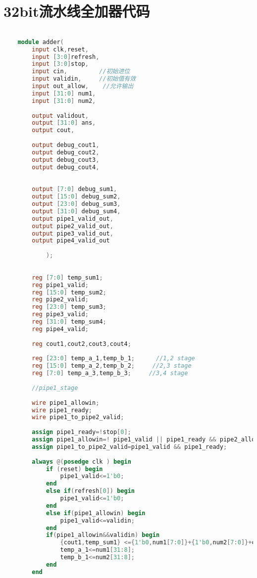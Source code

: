 \section{32bit流水线全加器代码}
\begin{lstlisting}[language=Verilog]

    module adder(
        input clk,reset,
        input [3:0]refresh,
        input [3:0]stop,
        input cin,         //初始进位
        input validin,     //初始值有效
        input out_allow,    //允许输出
        input [31:0] num1,
        input [31:0] num2,
        
        output validout,
        output [31:0] ans,
        output cout,
        
        output debug_cout1,
        output debug_cout2,
        output debug_cout3,
        output debug_cout4,
        
        
        output [7:0] debug_sum1,
        output [15:0] debug_sum2,
        output [23:0] debug_sum3,
        output [31:0] debug_sum4,
        output pipe1_valid_out,
        output pipe2_valid_out,
        output pipe3_valid_out,
        output pipe4_valid_out
        
            );
        
        
        reg [7:0] temp_sum1;
        reg pipe1_valid;
        reg [15:0] temp_sum2;
        reg pipe2_valid;
        reg [23:0] temp_sum3;
        reg pipe3_valid;
        reg [31:0] temp_sum4;
        reg pipe4_valid;
        
        reg cout1,cout2,cout3,cout4;
        
        reg [23:0] temp_a_1,temp_b_1;      //1,2 stage
        reg [15:0] temp_a_2,temp_b_2;     //2,3 stage
        reg [7:0] temp_a_3,temp_b_3;     //3,4 stage
        
        //pipe1_stage
        
        wire pipe1_allowin;
        wire pipe1_ready;
        wire pipe1_to_pipe2_valid;
        
        assign pipe1_ready=!stop[0];
        assign pipe1_allowin=! pipe1_valid || pipe1_ready && pipe2_allowin;
        assign pipe1_to_pipe2_valid=pipe1_valid && pipe1_ready;
        
        always @(posedge clk ) begin
            if (reset) begin
                pipe1_valid<=1'b0;
            end
            else if(refresh[0]) begin
                pipe1_valid<=1'b0;
            end
            else if(pipe1_allowin) begin
                pipe1_valid<=validin;
            end
            if(pipe1_allowin&&validin) begin
                {cout1,temp_sum1} <={1'b0,num1[7:0]}+{1'b0,num2[7:0]}+cin;
                temp_a_1<=num1[31:8];
                temp_b_1<=num2[31:8];
            end
        end
        

\end{lstlisting}
